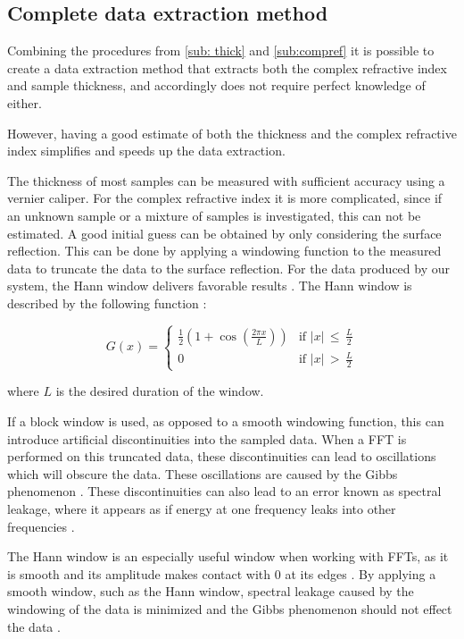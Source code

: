 \subsection{Complete data extraction method}
\label{sub:datex}
Combining the procedures from \ref{sub: thick} and \ref{sub:compref} it is possible to create a data extraction method that extracts both the complex refractive index and sample thickness, and accordingly does not require perfect knowledge of either.

However, having a good estimate of both the thickness and the complex refractive index simplifies and speeds up the data extraction.

The thickness of most samples can be measured with sufficient accuracy using a vernier caliper. For the complex refractive index it is more complicated, since if an unknown sample or a mixture of samples is investigated, this can not be estimated. A good initial guess can be obtained by only considering the surface reflection. This can be done by applying a  windowing function to the measured data to truncate the data to the surface reflection. For the data produced by our system, the Hann window delivers favorable results \cite{ni2019}. The Hann window is described by the following function \cite{Stearns2005}:

\begin{equation*}
G(x) = \begin{cases}
\frac{1}{2}\left(1+\cos\left(\frac{2\pi x}{L}\right)\right) &\text{if $|x|\,\leq\,\frac{L}{2}$}\\
0 &\text{if $|x|\,>\,\frac{L}{2}$}
\end{cases}
\label{eq:Hann}
\end{equation*}

where $L$ is the desired duration of the window.

If a block window is used, as opposed to a smooth windowing function, this can introduce artificial discontinuities into the sampled data. When a FFT is performed on this truncated data, these discontinuities can lead to oscillations which will obscure the data. These oscillations are caused by the Gibbs phenomenon \cite{ZillAndCullen-2009}.
These discontinuities can also lead to an error known as spectral leakage, where it appears as if energy at one frequency leaks into other frequencies \cite{ni2019}. 

The Hann window is an especially useful window when working with FFTs, as it is smooth and its amplitude makes contact with $0$ at its edges \cite{ni2019}. By applying a smooth window, such as the Hann window, spectral leakage caused by the windowing of the data is minimized \cite{ni2019} and the Gibbs phenomenon should not effect the data \cite{Stearns2005}.

